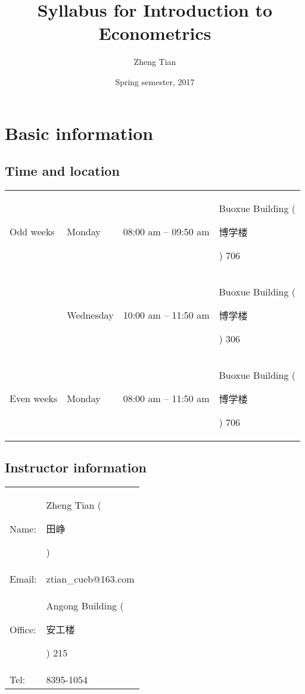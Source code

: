 \documentclass[a4paper,11pt]{article}
\author{Zheng Tian}
\date{Spring semester, 2017}
\title{Syllabus for Introduction to Econometrics}
\begin{document}
\maketitle

\section{Basic information}
\label{sec:org1406c79}

\subsection*{Time and location}
\label{sec:org401e86e}

\begin{center}
\begin{tabular}{llll}
Odd weeks & Monday & 08:00 am -- 09:50 am & Buoxue Building (\begin{CJK}{UTF8}{gbsn}博学楼\end{CJK}) 706\\
 & Wednesday & 10:00 am -- 11:50 am & Buoxue Building (\begin{CJK}{UTF8}{gbsn}博学楼\end{CJK}) 306\\
Even weeks & Monday & 08:00 am -- 11:50 am & Buoxue Building (\begin{CJK}{UTF8}{gbsn}博学楼\end{CJK}) 706\\
\end{tabular}
\end{center}


\subsection*{Instructor information}
\label{sec:org2977feb}

\begin{center}
\begin{tabular}{ll}
Name: & Zheng Tian (\begin{CJK*}{UTF8}{gbsn}田峥\end{CJK*})\\
Email: & ztian\_cueb@163.com\\
Office: & Angong Building (\begin{CJK*}{UTF8}{gbsn}安工楼\end{CJK*}) 215\\
Tel: & 8395-1054\\
\end{tabular}
\end{center}
\end{document}
